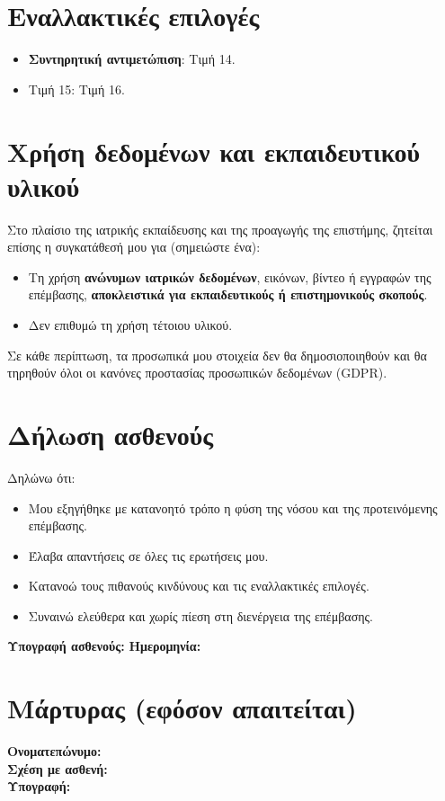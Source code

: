 \documentclass[10pt,greek]{article}
\begin{document}
\section{Εναλλακτικές επιλογές}
\begin{itemize}
\item \textbf{Συντηρητική αντιμετώπιση}: Τιμή 14.
\item Τιμή 15: Τιμή 16.
\end{itemize}

\section{Χρήση δεδομένων και εκπαιδευτικού υλικού}
Στο πλαίσιο της ιατρικής εκπαίδευσης και της προαγωγής της επιστήμης, ζητείται επίσης η συγκατάθεσή μου για (σημειώστε ένα):
\begin{itemize}
\item[{\faSquare[regular]}] Τη χρήση \textbf{ανώνυμων ιατρικών δεδομένων}, εικόνων, βίντεο ή εγγραφών της επέμβασης, \textbf{αποκλειστικά για εκπαιδευτικούς ή επιστημονικούς σκοπούς}.
\item[{\faSquare[regular]}] Δεν επιθυμώ τη χρήση τέτοιου υλικού.
\end{itemize}
Σε κάθε περίπτωση, τα προσωπικά μου στοιχεία δεν θα δημοσιοποιηθούν και θα τηρηθούν όλοι οι κανόνες προστασίας προσωπικών δεδομένων (GDPR).

\section{Δήλωση ασθενούς}
Δηλώνω ότι:
\begin{itemize}
\item Μου εξηγήθηκε με κατανοητό τρόπο η φύση της νόσου και της προτεινόμενης επέμβασης.
\item Έλαβα απαντήσεις σε όλες τις ερωτήσεις μου.
\item Κατανοώ τους πιθανούς κινδύνους και τις εναλλακτικές επιλογές.
\item Συναινώ ελεύθερα και χωρίς πίεση στη διενέργεια της επέμβασης.
\end{itemize}

\vspace{1em}
\noindent\textbf{Υπογραφή ασθενούς:} \underline{\hspace{6cm}} \hfill \textbf{Ημερομηνία:} \underline{\hspace{3cm}}

\section{Μάρτυρας (εφόσον απαιτείται)}
\noindent\textbf{Ονοματεπώνυμο:} \underline{\hspace{6cm}} \\[0.5em]
\textbf{Σχέση με ασθενή:} \underline{\hspace{6cm}} \\[0.5em]
\textbf{Υπογραφή:} \underline{\hspace{6cm}}
\end{document}
